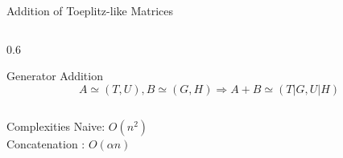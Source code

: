 \begin{frame}{Addition of Toeplitz-like Matrices}
  \begin{columns}
    \begin{column}{0.6\textwidth}
      \begin{block}{Generator Addition}
        \[
          A \simeq (T,U), B \simeq (G,H) \Rightarrow A + B \simeq (T | G, U | H)
        \]
      \end{block}
    \end{column}
  \end{columns}
  \vspace{1em}
  \begin{block}{Complexities}
    Naive: $O(n^2)$           \\
    Concatenation : $O(\alpha n)$
  \end{block}
\end{frame}
